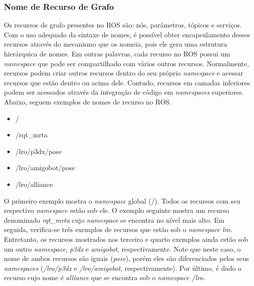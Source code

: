             \subsubsection{Nome de Recurso de Grafo} \label{subsubsec:ros_nomes_grafo}
            
                Os recursos de grafo presentes no ROS são: nós, parâmetros, tópicos e serviços. Com o uso adequado da sintaxe de nomes, é possível obter encapsulamento desses recursos através do mecanismo que os nomeia, pois ele gera uma estrutura hierárquica de nomes. Em outras palavras, cada recurso no ROS possui um \textit{namespace} que pode ser compartilhado com vários outros recursos. Normalmente, recursos podem criar outros recursos dentro do seu próprio \textit{namespace} e acessar recursos que estão dentro ou acima dele. Contudo, recursos em camadas inferiores podem ser acessados através da integração de código em \textit{namespaces} superiores. Abaixo, seguem exemplos de nomes de recurso no ROS.
                
                \begin{itemize}
                    \item /
                    
                    \item /rqt\_mrta
                    
                    \item /lro/p3dx/pose
                    
                    \item /lro/amigobot/pose
                    
                    \item /lro/alliance
                \end{itemize}
                
                O primeiro exemplo mostra o \textit{namespace} global (/). Todos os recursos com seu respectivo \textit{namespace} estão sob ele. O exemplo seguinte mostra um recurso denominado \textit{rqt\_mrta} cujo \textit{namespace} se encontra no nível mais alto. Em seguida, verifica-se três exemplos de recursos que estão sob o \textit{namespace lro}. Entretanto, os recursos mostrados nos terceiro e quarto exemplos ainda estão sob um outro \textit{namespace}, \textit{p3dx} e \textit{amigobot}, respectivamente. Note que neste caso, o nome de ambos recursos são iguais (\textit{pose}), porém eles são diferenciados pelos seus \textit{namespaces} (\textit{/lro/p3dx} e \textit{/lro/amigobot}, respectivamente). Por último, é dado o recurso cujo nome é \textit{alliance} que se encontra sob o \textit{namespace /lro}. 
                
